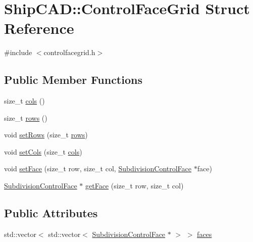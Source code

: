 \hypertarget{structShipCAD_1_1ControlFaceGrid}{}\section{Ship\+C\+AD\+:\+:Control\+Face\+Grid Struct Reference}
\label{structShipCAD_1_1ControlFaceGrid}


{\ttfamily \#include $<$controlfacegrid.\+h$>$}

\subsection*{Public Member Functions}
\begin{DoxyCompactItemize}
\item 
size\+\_\+t \hyperlink{structShipCAD_1_1ControlFaceGrid_ab7a808def28fd23029532f1bce5bb674}{cols} ()
\item 
size\+\_\+t \hyperlink{structShipCAD_1_1ControlFaceGrid_a8b124d162ea1d32383f4896e29811c12}{rows} ()
\item 
void \hyperlink{structShipCAD_1_1ControlFaceGrid_a5022cc08e6d00215fff8583518098d4e}{set\+Rows} (size\+\_\+t \hyperlink{structShipCAD_1_1ControlFaceGrid_a8b124d162ea1d32383f4896e29811c12}{rows})
\item 
void \hyperlink{structShipCAD_1_1ControlFaceGrid_ad2d6840064503024af3af888b1e315e8}{set\+Cols} (size\+\_\+t \hyperlink{structShipCAD_1_1ControlFaceGrid_ab7a808def28fd23029532f1bce5bb674}{cols})
\item 
void \hyperlink{structShipCAD_1_1ControlFaceGrid_a07c8ccb4bc08c0561aedbbbe0b1322ef}{set\+Face} (size\+\_\+t row, size\+\_\+t col, \hyperlink{classShipCAD_1_1SubdivisionControlFace}{Subdivision\+Control\+Face} $\ast$face)
\item 
\hyperlink{classShipCAD_1_1SubdivisionControlFace}{Subdivision\+Control\+Face} $\ast$ \hyperlink{structShipCAD_1_1ControlFaceGrid_ae77d2fb91a62c9631c66786a905d256d}{get\+Face} (size\+\_\+t row, size\+\_\+t col)
\end{DoxyCompactItemize}
\subsection*{Public Attributes}
\begin{DoxyCompactItemize}
\item 
std\+::vector$<$ std\+::vector$<$ \hyperlink{classShipCAD_1_1SubdivisionControlFace}{Subdivision\+Control\+Face} $\ast$ $>$ $>$ \hyperlink{structShipCAD_1_1ControlFaceGrid_aa040d7465260af92995eff9ef7623984}{faces}
\end{DoxyCompactItemize}


